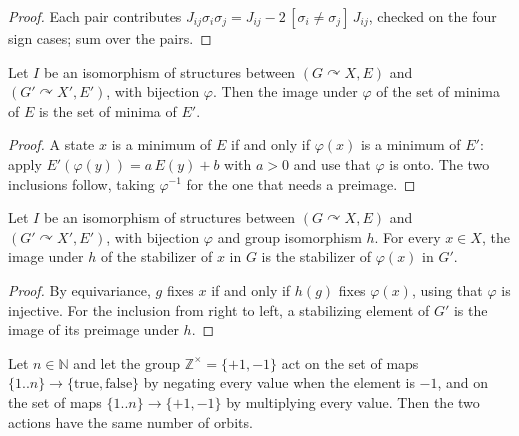 \begin{proof}
  \leanok
  Each pair contributes $J_{ij}\sigma_i\sigma_j = J_{ij} - 2\,[\sigma_i \ne \sigma_j]\,J_{ij}$,
  checked on the four sign cases; sum over the pairs.
\end{proof}

\begin{theorem}
  \label{thm:physics-image-minimos}
  \leanok
  Let $I$ be an isomorphism of structures between $(G \curvearrowright X, E)$ and
  $(G' \curvearrowright X', E')$, with bijection $\varphi$. Then the image under $\varphi$ of the
  set of minima of $E$ is the set of minima of $E'$.
  \own{}
\end{theorem}

\begin{proof}
  \leanok
  A state $x$ is a minimum of $E$ if and only if $\varphi(x)$ is a minimum of $E'$: apply
  $E'(\varphi(y)) = a\,E(y) + b$ with $a > 0$ and use that $\varphi$ is onto. The two inclusions
  follow, taking $\varphi^{-1}$ for the one that needs a preimage.
\end{proof}

\begin{theorem}
  \label{thm:physics-map-stabilizer}
  \leanok
  Let $I$ be an isomorphism of structures between $(G \curvearrowright X, E)$ and
  $(G' \curvearrowright X', E')$, with bijection $\varphi$ and group isomorphism $h$. For every
  $x \in X$, the image under $h$ of the stabilizer of $x$ in $G$ is the stabilizer of $\varphi(x)$
  in $G'$.
  \own{}
\end{theorem}

\begin{proof}
  \leanok
  By equivariance, $g$ fixes $x$ if and only if $h(g)$ fixes $\varphi(x)$, using that $\varphi$ is
  injective. For the inclusion from right to left, a stabilizing element of $G'$ is the image of
  its preimage under $h$.
\end{proof}

\begin{theorem}
  \label{thm:physics-orbitas-sat-espin}
  \leanok
  Let $n \in \mathbb{N}$ and let the group $\mathbb{Z}^{\times} = \{+1, -1\}$ act on the set of maps
  $\{1..n\} \to \{\mathrm{true}, \mathrm{false}\}$ by negating every value when the element is $-1$,
  and on the set of maps $\{1..n\} \to \{+1, -1\}$ by multiplying every value. Then the two
  actions have the same number of orbits.
  \own{}
\end{theorem}

